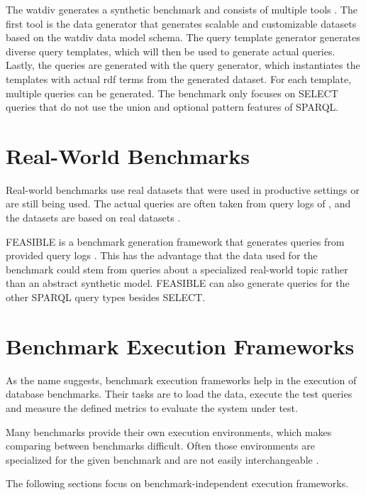 The \ac{watdiv} generates a synthetic benchmark and consists of multiple tools \cite{alucDiversifiedStressTesting2014}.
The first tool is the data generator that generates scalable and customizable datasets based on the \ac{watdiv} data model schema.
The query template generator generates diverse query templates, which will then be used to generate actual queries.
Lastly, the queries are generated with the query generator, which instantiates the templates with actual \ac{rdf} terms from the generated dataset.
For each template, multiple queries can be generated.
The benchmark only focuses on SELECT queries that do not use the union and optional pattern features of SPARQL.

\section{Real-World Benchmarks}
\label{sec:benchmarks_real_data}
Real-world benchmarks use real datasets that were used in productive settings or are still being used.
The actual queries are often taken from query logs of \tsp{}, and the datasets are based on real datasets \cite{morseyDBpediaSPARQLBenchmark2011, saleemFEASIBLEFeatureBasedSPARQL2015}.

FEASIBLE is a benchmark generation framework that generates queries from provided query logs \cite{saleemFEASIBLEFeatureBasedSPARQL2015}.
This has the advantage that the data used for the benchmark could stem from queries about a specialized real-world topic rather than an abstract synthetic model.
FEASIBLE can also generate queries for the other SPARQL query types besides SELECT.

\section{Benchmark Execution Frameworks}
\label{sec:benchmark_frameworks}
As the name suggests, benchmark execution frameworks help in the execution of database benchmarks.
Their tasks are to load the data, execute the test queries and measure the defined metrics to evaluate the system under test.

Many benchmarks provide their own execution environments, which makes comparing between benchmarks difficult.
Often those environments are specialized for the given benchmark and are not easily interchangeable \cite{conradsIguanaGenericFramework2017}.

The following sections focus on benchmark-independent execution frameworks.


